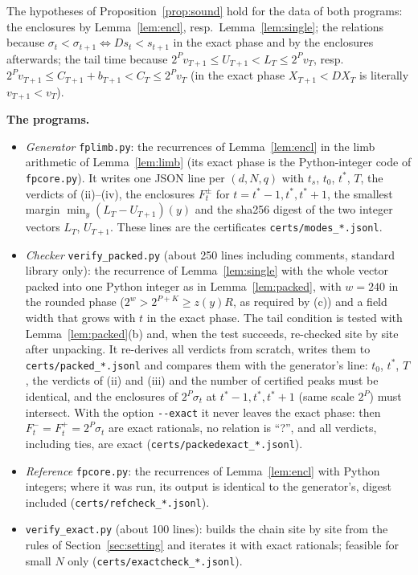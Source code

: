 \documentclass[11pt,a4paper]{article}
\theoremstyle{definition}
\theoremstyle{remark}
\begin{document}
The hypotheses of Proposition~\ref{prop:sound} hold for the data of both programs: the enclosures by Lemma~\ref{lem:encl}, resp.\ Lemma~\ref{lem:single}; the relations because $\sigma_t<\sigma_{t+1}\iff Ds_t<s_{t+1}$ in the exact phase and by the enclosures afterwards; the tail time because $2^Pv_{T+1}\le U_{T+1}<L_T\le2^Pv_T$, resp.\ $2^Pv_{T+1}\le C_{T+1}+b_{T+1}<C_T\le2^Pv_T$ (in the exact phase $X_{T+1}<DX_T$ is literally $v_{T+1}<v_T$).

\textbf{The programs.}
\begin{itemize}
\item \emph{Generator} \texttt{fplimb.py}: the recurrences of Lemma~\ref{lem:encl} in the limb arithmetic of Lemma~\ref{lem:limb} (its exact phase is the Python-integer code of \texttt{fpcore.py}). It writes one JSON line per $(d,N,q)$ with $t_s$, $t_0$, $t^*$, $T$, the verdicts of (ii)--(iv), the enclosures $F^\pm_t$ for $t=t^*-1,t^*,t^*+1$, the smallest margin $\min_y(L_T-U_{T+1})(y)$ and the sha256 digest of the two integer vectors $L_T$, $U_{T+1}$. These lines are the certificates \texttt{certs/modes\_*.jsonl}.
\item \emph{Checker} \texttt{verify\_packed.py} (about 250 lines including comments, standard library only): the recurrence of Lemma~\ref{lem:single} with the whole vector packed into one Python integer as in Lemma~\ref{lem:packed}, with $w=240$ in the rounded phase ($2^w>2^{P+K}\ge z(y)R$, as required by (c)) and a field width that grows with $t$ in the exact phase. The tail condition is tested with Lemma~\ref{lem:packed}(b) and, when the test succeeds, re-checked site by site after unpacking. It re-derives all verdicts from scratch, writes them to \texttt{certs/packed\_*.jsonl} and compares them with the generator's line: $t_0$, $t^*$, $T$, the verdicts of (ii) and (iii) and the number of certified peaks must be identical, and the enclosures of $2^P\sigma_t$ at $t^*-1,t^*,t^*+1$ (same scale $2^P$) must intersect. With the option \texttt{-{}-exact} it never leaves the exact phase: then $F^-_t=F^+_t=2^P\sigma_t$ are exact rationals, no relation is ``?'', and all verdicts, including ties, are exact (\texttt{certs/packedexact\_*.jsonl}).
\item \emph{Reference} \texttt{fpcore.py}: the recurrences of Lemma~\ref{lem:encl} with Python integers; where it was run, its output is identical to the generator's, digest included (\texttt{certs/refcheck\_*.jsonl}).
\item \texttt{verify\_exact.py} (about 100 lines): builds the chain site by site from the rules of Section~\ref{sec:setting} and iterates it with exact rationals; feasible for small $N$ only (\texttt{certs/exactcheck\_*.jsonl}).
\end{itemize}
\end{document}
